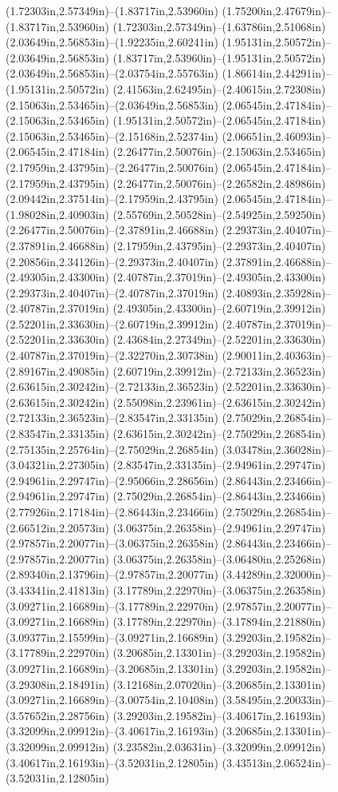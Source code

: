 (1.72303in,2.57349in)--(1.83717in,2.53960in) (1.75200in,2.47679in)--(1.83717in,2.53960in) (1.72303in,2.57349in)--(1.63786in,2.51068in) (2.03649in,2.56853in)--(1.92235in,2.60241in) (1.95131in,2.50572in)--(2.03649in,2.56853in) (1.83717in,2.53960in)--(1.95131in,2.50572in) (2.03649in,2.56853in)--(2.03754in,2.55763in) (1.86614in,2.44291in)--(1.95131in,2.50572in) (2.41563in,2.62495in)--(2.40615in,2.72308in) (2.15063in,2.53465in)--(2.03649in,2.56853in) (2.06545in,2.47184in)--(2.15063in,2.53465in) (1.95131in,2.50572in)--(2.06545in,2.47184in) (2.15063in,2.53465in)--(2.15168in,2.52374in) (2.06651in,2.46093in)--(2.06545in,2.47184in) (2.26477in,2.50076in)--(2.15063in,2.53465in) (2.17959in,2.43795in)--(2.26477in,2.50076in) (2.06545in,2.47184in)--(2.17959in,2.43795in) (2.26477in,2.50076in)--(2.26582in,2.48986in) (2.09442in,2.37514in)--(2.17959in,2.43795in) (2.06545in,2.47184in)--(1.98028in,2.40903in) (2.55769in,2.50528in)--(2.54925in,2.59250in) (2.26477in,2.50076in)--(2.37891in,2.46688in) (2.29373in,2.40407in)--(2.37891in,2.46688in) (2.17959in,2.43795in)--(2.29373in,2.40407in) (2.20856in,2.34126in)--(2.29373in,2.40407in) (2.37891in,2.46688in)--(2.49305in,2.43300in) (2.40787in,2.37019in)--(2.49305in,2.43300in) (2.29373in,2.40407in)--(2.40787in,2.37019in) (2.40893in,2.35928in)--(2.40787in,2.37019in) (2.49305in,2.43300in)--(2.60719in,2.39912in) (2.52201in,2.33630in)--(2.60719in,2.39912in) (2.40787in,2.37019in)--(2.52201in,2.33630in) (2.43684in,2.27349in)--(2.52201in,2.33630in) (2.40787in,2.37019in)--(2.32270in,2.30738in) (2.90011in,2.40363in)--(2.89167in,2.49085in) (2.60719in,2.39912in)--(2.72133in,2.36523in) (2.63615in,2.30242in)--(2.72133in,2.36523in) (2.52201in,2.33630in)--(2.63615in,2.30242in) (2.55098in,2.23961in)--(2.63615in,2.30242in) (2.72133in,2.36523in)--(2.83547in,2.33135in) (2.75029in,2.26854in)--(2.83547in,2.33135in) (2.63615in,2.30242in)--(2.75029in,2.26854in) (2.75135in,2.25764in)--(2.75029in,2.26854in) (3.03478in,2.36028in)--(3.04321in,2.27305in) (2.83547in,2.33135in)--(2.94961in,2.29747in) (2.94961in,2.29747in)--(2.95066in,2.28656in) (2.86443in,2.23466in)--(2.94961in,2.29747in) (2.75029in,2.26854in)--(2.86443in,2.23466in) (2.77926in,2.17184in)--(2.86443in,2.23466in) (2.75029in,2.26854in)--(2.66512in,2.20573in) (3.06375in,2.26358in)--(2.94961in,2.29747in) (2.97857in,2.20077in)--(3.06375in,2.26358in) (2.86443in,2.23466in)--(2.97857in,2.20077in) (3.06375in,2.26358in)--(3.06480in,2.25268in) (2.89340in,2.13796in)--(2.97857in,2.20077in) (3.44289in,2.32000in)--(3.43341in,2.41813in) (3.17789in,2.22970in)--(3.06375in,2.26358in) (3.09271in,2.16689in)--(3.17789in,2.22970in) (2.97857in,2.20077in)--(3.09271in,2.16689in) (3.17789in,2.22970in)--(3.17894in,2.21880in) (3.09377in,2.15599in)--(3.09271in,2.16689in) (3.29203in,2.19582in)--(3.17789in,2.22970in) (3.20685in,2.13301in)--(3.29203in,2.19582in) (3.09271in,2.16689in)--(3.20685in,2.13301in) (3.29203in,2.19582in)--(3.29308in,2.18491in) (3.12168in,2.07020in)--(3.20685in,2.13301in) (3.09271in,2.16689in)--(3.00754in,2.10408in) (3.58495in,2.20033in)--(3.57652in,2.28756in) (3.29203in,2.19582in)--(3.40617in,2.16193in) (3.32099in,2.09912in)--(3.40617in,2.16193in) (3.20685in,2.13301in)--(3.32099in,2.09912in) (3.23582in,2.03631in)--(3.32099in,2.09912in) (3.40617in,2.16193in)--(3.52031in,2.12805in) (3.43513in,2.06524in)--(3.52031in,2.12805in) 